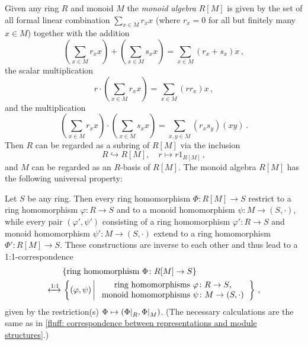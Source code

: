 \begin{remark}
  \label{remark: monoid algebra}
  Given any ring $R$ and monoid $M$ the \emph{monoid algebra} $R[M]$ is given by the set of all formal linear combination $\sum_{x \in M} r_x x$ (where $r_x = 0$ for all but finitely many $x \in M$) together with the addition
  \[
      \left( \sum_{x \in M} r_x x \right)
    + \left( \sum_{x \in M} s_x x \right)
    = \sum_{x \in M} (r_x + s_x) x \,,
  \]
  the scalar multiplication
  \[
      r \cdot \left( \sum_{x \in M} r_x x \right)
    = \sum_{x \in M} (r r_x) x \,,
  \]
  and the multiplication
  \[
          \left( \sum_{x \in M} r_x x \right)
    \cdot \left( \sum_{x \in M} s_x x \right)
    = \sum_{x, y \in M} (r_x s_y) (xy) \,.
  \]
  Then $R$ can be regarded as a subring of $R[M]$ via the inclusion
  \[
                    R
    \hookrightarrow R[M],
    \quad           r
    \mapsto         r 1_{R[M]} \,,
  \]
  and $M$ can be regarded as an $R$-basis of $R[M]$.
  The monoid algebra $R[M]$ has the following universal property:
  
  Let $S$ be any ring.
  Then every ring homomorphism $\Phi \colon R[M] \to S$ restrict to a ring homomorphism $\varphi \colon R \to S$ and to a monoid homomorphism $\psi \colon M \to (S, \cdot)$, while every pair $(\varphi', \psi')$ consisting of a ring homomorphism $\varphi' \colon R \to S$ and monoid homomorphism $\psi' \colon M \to (S, \cdot)$ extend to a ring homomorphism $\Phi' \colon R[M] \to S$.
  These constructions are inverse to each other and thus lead to a 1:1-correspondence
  \begin{align*}
                         &\,  \{ \text{ring homomorphism $\Phi \colon R[M] \to S$} \} \\
    \xleftrightarrow{1:1}&\,  \left\{
                                (\varphi, \psi)
                              \suchthat*
                                \begin{tabular}{c}
                                  ring homomorphisms $\varphi \colon R \to S$, \\
                                  monoid homomorphisms $\psi \colon M \to (S, \cdot)$
                                \end{tabular}
                              \right\} \,,
  \end{align*}
  given by the restriction(s) $\Phi \mapsto (\restrict{\Phi}{R}, \restrict{\Phi}{M})$.
  (The necessary calculations are the same as in \ref{fluff: correspondence between representations and module structures}.)
  

\end{remark}
